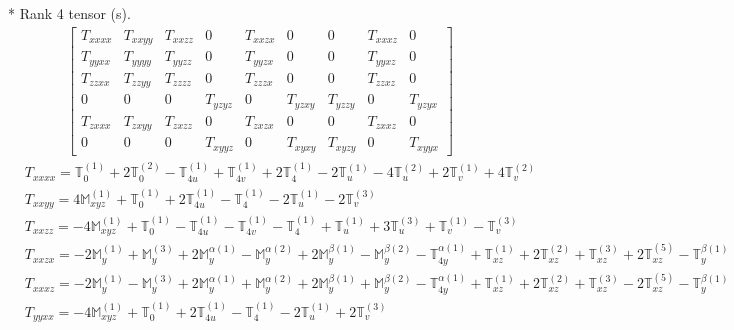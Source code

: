 \documentclass[fleqn,8pt,landscape]{jsarticle}
\begin{document}
* Rank 4 tensor (s).
\begin{align*}
\begin{bmatrix} T_{xxxx} & T_{xxyy} & T_{xxzz} & 0 & T_{xxzx} & 0 & 0 & T_{xxxz} & 0 \\ T_{yyxx} & T_{yyyy} & T_{yyzz} & 0 & T_{yyzx} & 0 & 0 & T_{yyxz} & 0 \\ T_{zzxx} & T_{zzyy} & T_{zzzz} & 0 & T_{zzzx} & 0 & 0 & T_{zzxz} & 0 \\ 0 & 0 & 0 & T_{yzyz} & 0 & T_{yzxy} & T_{yzzy} & 0 & T_{yzyx} \\ T_{zxxx} & T_{zxyy} & T_{zxzz} & 0 & T_{zxzx} & 0 & 0 & T_{zxxz} & 0 \\ 0 & 0 & 0 & T_{xyyz} & 0 & T_{xyxy} & T_{xyzy} & 0 & T_{xyyx} \end{bmatrix}
\end{align*}
\begin{align*}
& T_{xxxx} = \mathbb{T}_{0}^{(1)} + 2 \mathbb{T}_{0}^{(2)} - \mathbb{T}_{4u}^{(1)} + \mathbb{T}_{4v}^{(1)} + 2 \mathbb{T}_{4}^{(1)} - 2 \mathbb{T}_{u}^{(1)} - 4 \mathbb{T}_{u}^{(2)} + 2 \mathbb{T}_{v}^{(1)} + 4 \mathbb{T}_{v}^{(2)} \\
& T_{xxyy} = 4 \mathbb{M}_{xyz}^{(1)} + \mathbb{T}_{0}^{(1)} + 2 \mathbb{T}_{4u}^{(1)} - \mathbb{T}_{4}^{(1)} - 2 \mathbb{T}_{u}^{(1)} - 2 \mathbb{T}_{v}^{(3)} \\
& T_{xxzz} = - 4 \mathbb{M}_{xyz}^{(1)} + \mathbb{T}_{0}^{(1)} - \mathbb{T}_{4u}^{(1)} - \mathbb{T}_{4v}^{(1)} - \mathbb{T}_{4}^{(1)} + \mathbb{T}_{u}^{(1)} + 3 \mathbb{T}_{u}^{(3)} + \mathbb{T}_{v}^{(1)} - \mathbb{T}_{v}^{(3)} \\
& T_{xxzx} = - 2 \mathbb{M}_{y}^{(1)} + \mathbb{M}_{y}^{(3)} + 2 \mathbb{M}_{y}^{\alpha(1)} - \mathbb{M}_{y}^{\alpha(2)} + 2 \mathbb{M}_{y}^{\beta(1)} - \mathbb{M}_{y}^{\beta(2)} - \mathbb{T}_{4y}^{\alpha(1)} + \mathbb{T}_{xz}^{(1)} + 2 \mathbb{T}_{xz}^{(2)} + \mathbb{T}_{xz}^{(3)} + 2 \mathbb{T}_{xz}^{(5)} - \mathbb{T}_{y}^{\beta(1)} \\
& T_{xxxz} = - 2 \mathbb{M}_{y}^{(1)} - \mathbb{M}_{y}^{(3)} + 2 \mathbb{M}_{y}^{\alpha(1)} + \mathbb{M}_{y}^{\alpha(2)} + 2 \mathbb{M}_{y}^{\beta(1)} + \mathbb{M}_{y}^{\beta(2)} - \mathbb{T}_{4y}^{\alpha(1)} + \mathbb{T}_{xz}^{(1)} + 2 \mathbb{T}_{xz}^{(2)} + \mathbb{T}_{xz}^{(3)} - 2 \mathbb{T}_{xz}^{(5)} - \mathbb{T}_{y}^{\beta(1)} \\
& T_{yyxx} = - 4 \mathbb{M}_{xyz}^{(1)} + \mathbb{T}_{0}^{(1)} + 2 \mathbb{T}_{4u}^{(1)} - \mathbb{T}_{4}^{(1)} - 2 \mathbb{T}_{u}^{(1)} + 2 \mathbb{T}_{v}^{(3)} \\

\end{align*}
\end{document}
